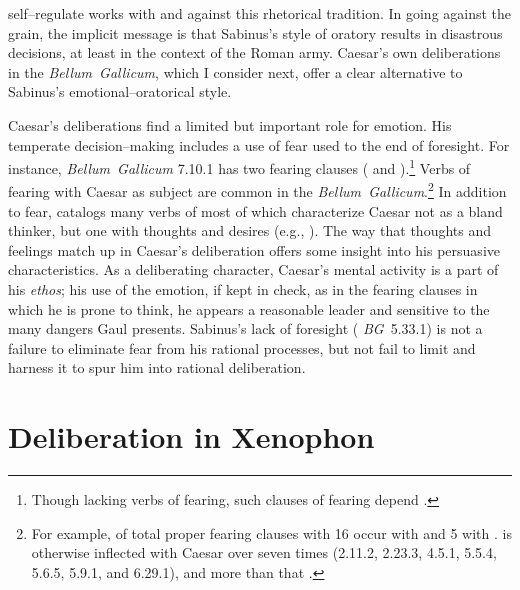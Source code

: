 \documentclass[12pt,letterpaper,oneside,final]{memoir}
\begin{document}
self--regulate works with and against this rhetorical tradition. In going against the grain, the implicit message is that Sabinus's style of oratory results in disastrous decisions, at least in the context of the Roman army. Caesar's own deliberations in the \emph{Bellum~Gallicum}, which I consider next, offer a clear alternative to Sabinus's emotional--oratorical style.

Caesar's deliberations find a limited but important role for emotion. His temperate decision--making includes a use of fear used to the end of foresight. For instance, \emph{Bellum~Gallicum} 7.10.1 has two fearing clauses ( and ).\footnote{Though lacking verbs of fearing, such clauses of fearing depend .} Verbs of fearing with Caesar as subject are common in the \emph{Bellum~Gallicum}.\footnote{For example, of total proper fearing clauses with  16 occur with  and 5 with  \parencite[s.~v.~{} II.A.a)β)εε)]{meusel1887}.  is otherwise inflected with Caesar over seven times (2.11.2, 2.23.3, 4.5.1, 5.5.4, 5.6.5, 5.9.1, and 6.29.1), and  more than that \parencite{meusel1887}.} In addition to fear, \textcite[438--440]{oldsjo2001} catalogs many verbs of  most of which characterize Caesar not as a bland thinker, but one with thoughts and desires (e.g.,   ). The way that thoughts and feelings match up in Caesar's deliberation offers some insight into his persuasive characteristics. As a deliberating character, Caesar's mental activity is a part of his \emph{ethos}; his use of the emotion, if kept in check, as in the fearing clauses in which he is prone to think, he appears a reasonable leader and sensitive to the many dangers Gaul presents. Sabinus's lack of foresight ( \emph{BG}~5.33.1) is not a failure to eliminate fear from his rational processes, but not fail to limit and harness it to spur him into rational deliberation.

\section{Deliberation in Xenophon}
\label{delib-xen}
\end{document}

